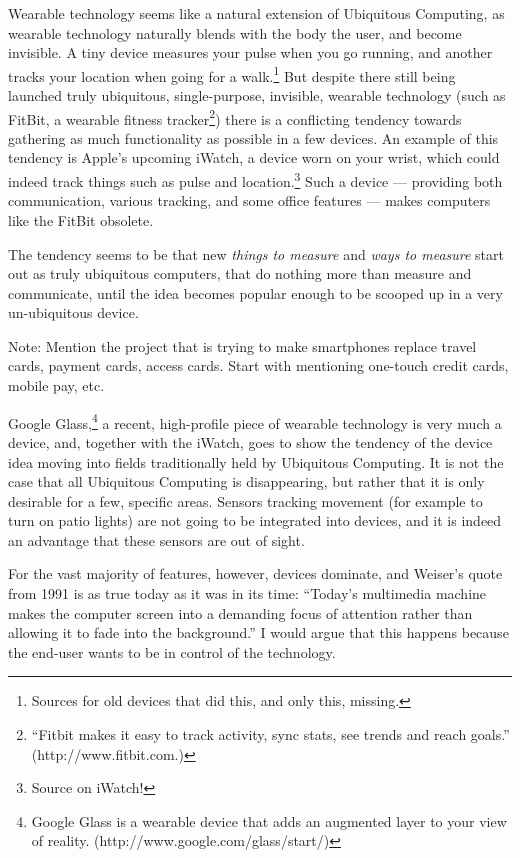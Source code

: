 Wearable technology seems like a natural extension of Ubiquitous Computing, as wearable technology naturally blends with the body
the user, and become invisible. A tiny device measures your pulse when you go running, and another tracks your location when going for a
walk.\footnote{Sources for old devices that did this, and only this, missing.} But despite there still being launched truly ubiquitous,
single-purpose, invisible, wearable technology (such as FitBit, a wearable fitness tracker\footnote{``Fitbit makes it easy to track
activity, sync stats, see trends and reach goals.'' (http://www.fitbit.com.)}) there is a conflicting tendency towards gathering as much
functionality as possible in a few devices. An example of this tendency is Apple's upcoming iWatch, a device worn on your wrist, which
could indeed track things such as pulse and location.\footnote{Source on iWatch!} Such a device --- providing both communication,
various tracking, and some office features --- makes computers like the FitBit obsolete.

The tendency seems to be that new \emph{things to measure} and \emph{ways to measure} start out as truly ubiquitous computers, that do
nothing more than measure and communicate, until the idea becomes popular enough to be scooped up in a very un-ubiquitous device.

Note: Mention the project that is trying to make smartphones replace travel cards, payment cards, access cards. Start with mentioning
one-touch credit cards, mobile pay, etc.

Google Glass,\footnote{Google Glass is a wearable device that adds an augmented layer to your view of reality. (http://www.google.com/glass/start/)}
a recent, high-profile piece of wearable technology is very much a device, and, together with the iWatch, goes to show the tendency of the device
idea moving into fields traditionally held by Ubiquitous Computing. It is not the case that all Ubiquitous Computing is disappearing, but rather
that it is only desirable for a few, specific areas. Sensors tracking movement (for example to turn on patio lights) are not going to be integrated
into devices, and it is indeed an advantage that these sensors are out of sight.

For the vast majority of features, however, devices dominate, and Weiser's quote from 1991 is as true today as it was in its
time: ``Today's multimedia machine makes the computer screen into a demanding focus of attention rather than allowing it to fade into the
background.''\cite{weiser91} I would argue that this happens because the end-user wants to be in control of the technology.

